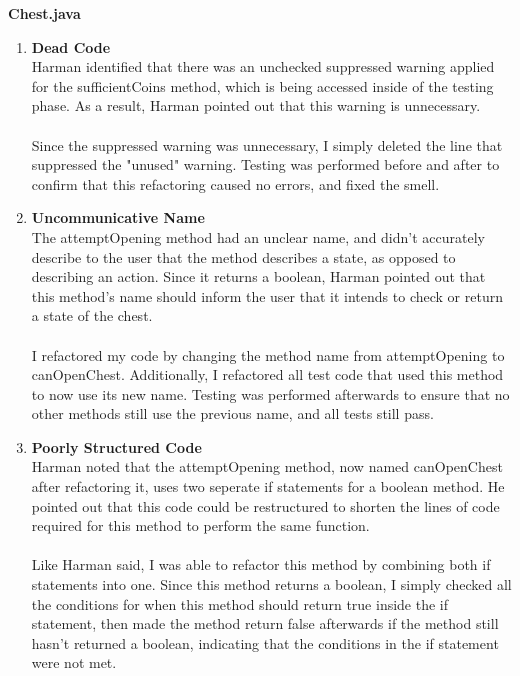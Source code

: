 \documentclass[12pt, letterpaper]{article}
\begin{document}
\textbf{Chest.java}
\begin{enumerate}
    \item \textbf{Dead Code} \\
    Harman identified that there was an unchecked suppressed warning applied for the sufficientCoins method, which is being accessed inside of the testing phase. As a result, Harman pointed out that this warning is unnecessary.
    \\
    \\
    Since the suppressed warning was unnecessary, I simply deleted the line that suppressed the "unused" warning. Testing was performed before and after to confirm that this refactoring caused no errors, and fixed the smell.
    
    \item \textbf{Uncommunicative Name} \\
    The attemptOpening method had an unclear name, and didn't accurately describe to the user that the method describes a state, as opposed to describing an action. Since it returns a boolean, Harman pointed out that this method's name should inform the user that it intends to check or return a state of the chest.
    \\
    \\
    I refactored my code by changing the method name from attemptOpening to canOpenChest. Additionally, I refactored all test code that used this method to now use its new name. Testing was performed afterwards to ensure that no other methods still use the previous name, and all tests still pass.
    
    \item \textbf{Poorly Structured Code} \\
    Harman noted that the attemptOpening method, now named canOpenChest after refactoring it, uses two seperate if statements for a boolean method. He pointed out that this code could be restructured to shorten the lines of code required for this method to perform the same function.
    \\
    \\
    Like Harman said, I was able to refactor this method by combining both if statements into one. Since this method returns a boolean, I simply checked all the conditions for when this method should return true inside the if statement, then made the method return false afterwards if the method still hasn't returned a boolean, indicating that the conditions in the if statement were not met.
    
\end{enumerate}
\end{document}
